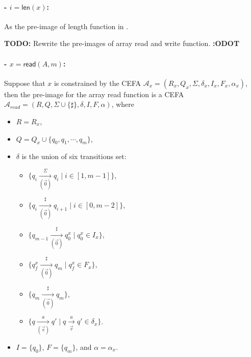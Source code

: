 \documentclass[12pt]{article}
\newcommand*{\aut}{\mathcal{A}}
\newcommand*{\myvec}[1]{\vec{#1}}
\newcommand{\arrconcat}{\sharp}
\newcommand{\todo}[1]{{\color{orange}\textbf{TODO:} #1 \textbf{:ODOT}\color{black}}}
\newcommand{\mylen}{\mathsf{len}}
\newcommand{\myread}{\mathsf{read}}
\newcommand{\myset}[1]{\{#1\}}
\theoremstyle{remark}
\begin{document}
\paragraph{- $i = \mylen(x)$:} As the pre-image of length function in \cite{atva2020}.

\todo{Rewrite the pre-images of array read and write function.}
\paragraph{- $x = \myread(A, m)$:} Suppose that $x$ is constrained by the CEFA $\aut_x=(R_x, Q_x, \Sigma, \delta_x, I_x, F_x, \alpha_x)$, then the pre-image for the array read function is a CEFA $\aut_{read}=(R, Q, \Sigma\cup\{\arrconcat\}, \delta, I, F, \alpha)$, where
\begin{itemize}
    \item $R = R_x$,
    \item $Q = Q_x\cup\myset{q_0, q_1, \cdots, q_{m}}$,
    \item $\delta$ is the union of six transitions set:
          \begin{itemize}
              \item $\myset{q_i\xrightarrow[(\myvec{0})]{\Sigma}q_i\mid i\in [1,m-1]}$,
              \item $\myset{q_i\xrightarrow[(\myvec{0})]{\arrconcat}q_{i+1}\mid i\in[0,m-2]}$,
              \item $\myset{q_{m-1}\xrightarrow[(\myvec{0})]{\arrconcat}q_0^x \mid q_0^x\in I_x}$,
              \item $\myset{q_f^x\xrightarrow[(\myvec{0})]{\arrconcat}q_m \mid q_f^x\in F_x}$,
              \item $\myset{q_m\xrightarrow[(\myvec{0})]{\arrconcat}q_m}$,
              \item $\myset{q\xrightarrow[(\myvec{v})]{a}q'\mid q\xrightarrow[\myvec{v}]{a}q'\in \delta_x}$.
          \end{itemize}
    \item $I = \myset{q_0}$, $F = \myset{q_m}$, and $\alpha = \alpha_x$.
\end{itemize}
\end{document}
